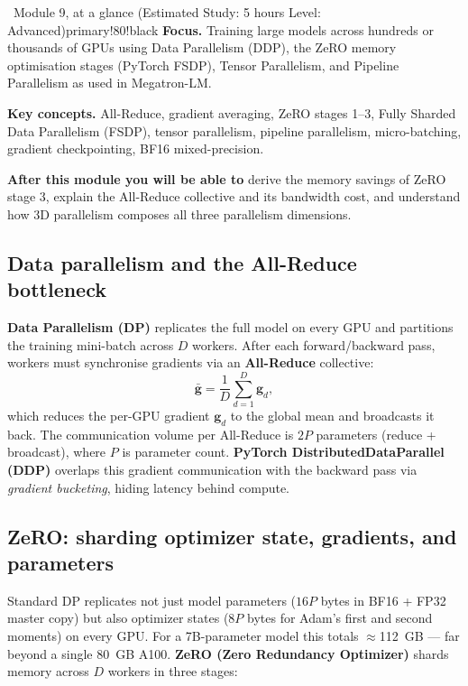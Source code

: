 \documentclass[11pt,a4paper]{article}
\begin{document}
	\begin{modulecard}{\faServer\ Module 9, at a glance \hfill \small\normalfont (Estimated Study: 5 hours \textbullet{} Level: Advanced)}{primary!80!black}
		\textbf{Focus.} Training large models across hundreds or thousands of GPUs using Data Parallelism (DDP), the ZeRO memory optimisation stages (PyTorch FSDP), Tensor Parallelism, and Pipeline Parallelism as used in Megatron-LM.

		\medskip
		\textbf{Key concepts.} All-Reduce, gradient averaging, ZeRO stages 1--3, Fully Sharded Data Parallelism (FSDP), tensor parallelism, pipeline parallelism, micro-batching, gradient checkpointing, BF16 mixed-precision.

		\medskip
		\textbf{After this module you will be able to} derive the memory savings of ZeRO stage 3, explain the All-Reduce collective and its bandwidth cost, and understand how 3D parallelism composes all three parallelism dimensions.
	\end{modulecard}

	\subsection{Data parallelism and the All-Reduce bottleneck}

	\textbf{Data Parallelism (DP)} replicates the full model on every GPU and partitions the training mini-batch across $D$ workers. After each forward/backward pass, workers must synchronise gradients via an \textbf{All-Reduce} collective:
	\begin{equation}
		\bar{\mathbf{g}} = \frac{1}{D}\sum_{d=1}^{D} \mathbf{g}_d,
	\end{equation}
	which reduces the per-GPU gradient $\mathbf{g}_d$ to the global mean and broadcasts it back. The communication volume per All-Reduce is $2P$ parameters (reduce + broadcast), where $P$ is parameter count. \textbf{PyTorch DistributedDataParallel (DDP)} overlaps this gradient communication with the backward pass via \emph{gradient bucketing}, hiding latency behind compute.

	\subsection{ZeRO: sharding optimizer state, gradients, and parameters}

	Standard DP replicates not just model parameters ($16P$ bytes in BF16 + FP32 master copy) but also optimizer states ($8P$ bytes for Adam's first and second moments) on every GPU. For a 7B-parameter model this totals $\approx$112~GB --- far beyond a single 80~GB A100. \textbf{ZeRO (Zero Redundancy Optimizer)} \parencite{rajbhandari2020zero} shards memory across $D$ workers in three stages:
\end{document}
